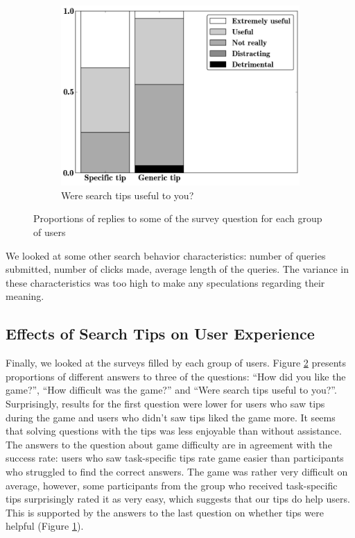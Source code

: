 \documentclass{sig-alternate}
\begin{document}
\begin{figure}[ht]
\begin{subfigure}[t]{0.3\textwidth}
	\includegraphics[scale=0.26]{img/useful}
	\caption{Were search tips useful to you?}
    \label{figure:survey:useful}
\end{subfigure}
\caption{Proportions of replies to some of the survey question for each group of users}
\label{figure:survey}
\end{figure}

\vspace{-3mm}
We looked at some other search behavior characteristics: number of queries submitted, number of clicks made, average length of the queries. The variance in these characteristics was too high to make any speculations regarding their meaning.

\subsection{Effects of Search Tips on User Experience}

Finally, we looked at the surveys filled by each group of users.
Figure \ref{figure:survey} presents proportions of different answers to three of the questions: ``How did you like the game?'', ``How difficult was the game?'' and ``Were search tips useful to you?''.
Surprisingly, results for the first question were lower for users who saw tips during the game and users who didn't saw tips liked the game more.
It seems that solving questions with the tips was less enjoyable than without assistance.
The answers to the question about game difficulty are in agreement with the success rate: users who saw task-specific tips rate game easier than participants who struggled to find the correct answers.
The game was rather very difficult on average, however, some participants from the group who received task-specific tips surprisingly rated it as very easy, which suggests that our tips do help users.
This is supported by the answers to the last question on whether tips were helpful (Figure \ref{figure:survey:useful}).
\end{document}
